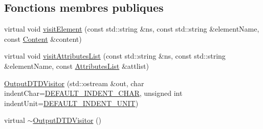 \subsection*{Fonctions membres publiques}
\begin{DoxyCompactItemize}
\item 
virtual void \hyperlink{classdtd_1_1_output_d_t_d_visitor_ab95fcc93547eb5e038040f11b0f2b568}{visitElement} (const std::string \&ns, const std::string \&elementName, const \hyperlink{classdtd_1_1_content}{Content} \&content)
\item 
virtual void \hyperlink{classdtd_1_1_output_d_t_d_visitor_aa1b6474bd068eca43a6eb61e90ff7504}{visitAttributesList} (const std::string \&ns, const std::string \&elementName, const \hyperlink{namespacedtd_a8d5d29abb5de0468925f321597f57f4b}{AttributesList} \&attlist)
\item 
\hyperlink{classdtd_1_1_output_d_t_d_visitor_a08955c8d094f68867e38aff3d8dc43c8}{OutputDTDVisitor} (std::ostream \&out, char indentChar=\hyperlink{classdtd_1_1_output_d_t_d_visitor_af8b2c8e68ec262f98a21334900cb09df}{DEFAULT\_\-INDENT\_\-CHAR}, unsigned int indentUnit=\hyperlink{classdtd_1_1_output_d_t_d_visitor_a7795d56eeb6ab2e68c8d3a43e1c6f487}{DEFAULT\_\-INDENT\_\-UNIT})
\item 
virtual \hyperlink{classdtd_1_1_output_d_t_d_visitor_a718af27bc574809f02592f0816a71e2b}{$\sim$OutputDTDVisitor} ()
\end{DoxyCompactItemize}
